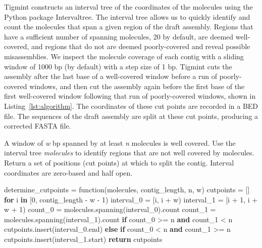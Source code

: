 \documentclass{bmcart}
\newenvironment{Shaded}{}{}
\newcommand{\ControlFlowTok}[1]{\textcolor[rgb]{0.00,0.44,0.13}{\textbf{#1}}}
\newcommand{\DecValTok}[1]{\textcolor[rgb]{0.25,0.63,0.44}{#1}}
\newcommand{\KeywordTok}[1]{\textcolor[rgb]{0.00,0.44,0.13}{\textbf{#1}}}
\newcommand{\NormalTok}[1]{#1}
\newcommand{\OperatorTok}[1]{\textcolor[rgb]{0.40,0.40,0.40}{#1}}
\begin{document}
Tigmint constructs an interval tree of the coordinates of the molecules using the Python package Intervaltree. The interval tree allows us to quickly identify and count the molecules that span a given region of the draft assembly. Regions that have a sufficient number of spanning molecules, 20 by default, are deemed well-covered, and regions that do not are deemed poorly-covered and reveal possible misassemblies. We inspect the molecule coverage of each contig with a sliding window of 1000 bp (by default) with a step size of 1 bp. Tigmint cuts the assembly after the last base of a well-covered window before a run of poorly-covered windows, and then cut the assembly again before the first base of the first well-covered window following that run of poorly-covered windows, shown in Listing~\ref{lst:algorithm}. The coordinates of these cut points are recorded in a BED file. The sequences of the draft assembly are split at these cut points, producing a corrected FASTA file.

\begin{codelisting}[!htbp]

\caption{A window of \emph{w} bp spanned by at least \emph{n} molecules is well covered. Use the interval tree \emph{molecules} to identify regions that are not well covered by molecules. Return a set of positions (cut points) at which to split the contig. Interval coordinates are zero-based and half open.}

\hypertarget{lst:algorithm}{%
\label{lst:algorithm}}%
\begin{Shaded}
\begin{Highlighting}[]
\NormalTok{determine_cutpoints }\OperatorTok{=}\NormalTok{ function(molecules, contig_length, n, w)}
\NormalTok{    cutpoints }\OperatorTok{=}\NormalTok{ []}
    \ControlFlowTok{for}\NormalTok{ i }\KeywordTok{in}\NormalTok{ [}\DecValTok{0}\NormalTok{, contig_length }\OperatorTok{-}\NormalTok{ w }\OperatorTok{-} \DecValTok{1}\NormalTok{)}
\NormalTok{        interval_0 }\OperatorTok{=}\NormalTok{ [i, i }\OperatorTok{+}\NormalTok{ w)}
\NormalTok{        interval_1 }\OperatorTok{=}\NormalTok{ [i }\OperatorTok{+} \DecValTok{1}\NormalTok{, i }\OperatorTok{+}\NormalTok{ w }\OperatorTok{+} \DecValTok{1}\NormalTok{)}
\NormalTok{        count_0 }\OperatorTok{=}\NormalTok{ molecules.spanning(interval_0).count}
\NormalTok{        count_1 }\OperatorTok{=}\NormalTok{ molecules.spanning(interval_1).count}
        \ControlFlowTok{if}\NormalTok{ count_0 }\OperatorTok{>=}\NormalTok{ n }\KeywordTok{and}\NormalTok{ count_1 }\OperatorTok{<}\NormalTok{ n}
\NormalTok{            cutpoints.insert(interval_0.end)}
        \ControlFlowTok{else}
        \ControlFlowTok{if}\NormalTok{ count_0 }\OperatorTok{<}\NormalTok{ n }\KeywordTok{and}\NormalTok{ count_1 }\OperatorTok{>=}\NormalTok{ n}
\NormalTok{            cutpoints.insert(interval_1.start)}
    \ControlFlowTok{return}\NormalTok{ cutpoints}
\NormalTok{}
\end{Highlighting}
\end{Shaded}

\end{codelisting}
\end{document}
